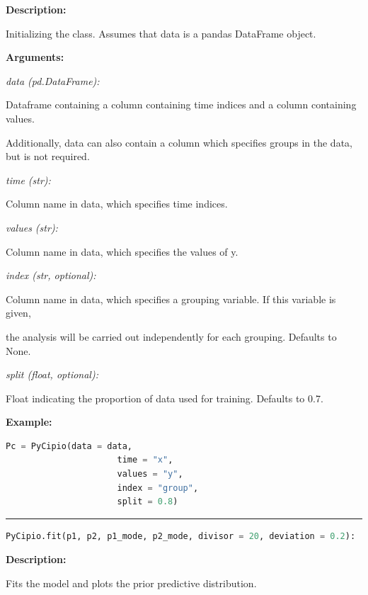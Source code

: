 \documentclass{article}
\begin{document}
\indent \textbf{Description:} 

\indent \indent Initializing the class. Assumes that data is a pandas DataFrame object.

\indent \textbf{Arguments:}

\indent \indent \textit{data (pd.DataFrame):} 

\indent \indent \indent Dataframe containing a column containing time indices and a column containing values. 

\indent \indent \indent Additionally, data can also contain a column which specifies groups in the data, but is not required. 

\indent \indent \textit{time (str):} 

\indent \indent \indent Column name in data, which specifies time indices.

\indent \indent \textit{values (str):} 

\indent \indent \indent Column name in data, which specifies the values of y.
            
\indent \indent \textit{index (str, optional):} 

\indent \indent \indent Column name in data, which specifies a grouping variable. If this variable is given, 

\indent \indent \indent the analysis will be carried out independently for each grouping. Defaults to None.

\indent \indent \textit{split (float, optional):} 

\indent \indent \indent Float indicating the proportion of data used for training. Defaults to 0.7.


\indent \textbf{Example:}
\begin{lstlisting}[language=Python]
		 Pc = PyCipio(data = data, 
                      time = "x", 
                      values = "y", 
                      index = "group", 
                      split = 0.8)

\end{lstlisting}

\hrule

\begin{lstlisting}[language=Python]
    PyCipio.fit(p1, p2, p1_mode, p2_mode, divisor = 20, deviation = 0.2):
\end{lstlisting}

\indent \textbf{Description:} 

\indent \indent Fits the model and plots the prior predictive distribution.
\end{document}
